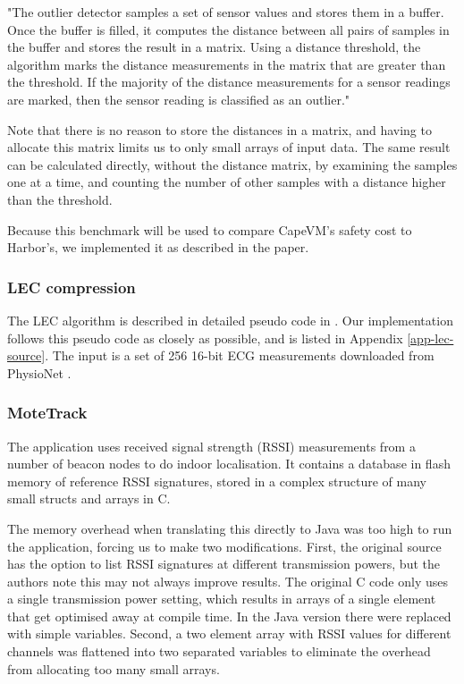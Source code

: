 \begin{displayquote}
"The outlier detector samples a set of sensor values and stores them in a buffer. Once the buffer is filled, it computes the distance between all pairs of samples in the buffer and stores the result in a matrix. Using a distance threshold, the algorithm marks the distance measurements in the matrix that are greater than the threshold. If the majority of the distance measurements for a sensor readings are marked, then the sensor reading is classified as an outlier."
\end{displayquote}

Note that there is no reason to store the distances in a matrix, and having to allocate this matrix limits us to only small arrays of input data. The same result can be calculated directly, without the distance matrix, by examining the samples one at a time, and counting the number of other samples with a distance higher than the threshold.

Because this benchmark will be used to compare CapeVM's safety cost to Harbor's, we implemented it as described in the paper.

\subsubsection{LEC compression}
The LEC algorithm is described in detailed pseudo code in \cite{Marcelloni:2009ja}. Our implementation follows this pseudo code as closely as possible, and is listed in Appendix \ref{app-lec-source}. The input is a set of 256 16-bit ECG measurements downloaded from PhysioNet \cite{physionet-ecg-data}.

\subsubsection{MoteTrack}
\label{sec-evaluation-benchmark-implementation-motetrack}
The  application uses received signal strength (RSSI) measurements from a number of beacon nodes to do indoor localisation. It contains a database in flash memory of reference RSSI signatures, stored in a complex structure of many small structs and arrays in C.

The memory overhead when translating this directly to Java was too high to run the application, forcing us to make two modifications. First, the original source has the option to list RSSI signatures at different transmission powers, but the authors note this may not always improve results. The original C code only uses a single transmission power setting, which results in arrays of a single element that get optimised away at compile time. In the Java version there were replaced with simple variables. Second, a two element array with RSSI values for different channels was flattened into two separated variables to eliminate the overhead from allocating too many small arrays.

